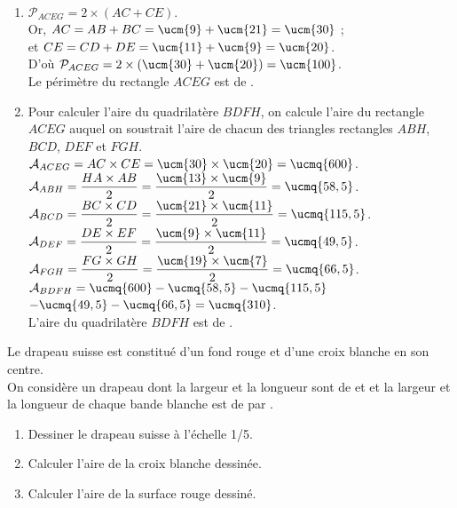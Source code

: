 \begin{colonne*exercice}
\begin{corrige}
   \ \\ [-5mm]
   \begin{enumerate}
      \item $\mathcal{P}_{ACEG} =2\times(AC+CE)$. \\
         Or, $AC =AB+BC =\ucm{9}+\ucm{21} =\ucm{30}$ ;\\
         et $CE =CD+DE =\ucm{11}+\ucm{9} =\ucm{20}$. \\
         D'où $\mathcal{P}_{ACEG} =2\times(\ucm{30}+\ucm{20}) =\ucm{100}$. \\
         {\blue Le périmètre du rectangle $ACEG$ est de }.
      \item Pour calculer l'aire du quadrilatère $BDFH$, on calcule l'aire du rectangle $ACEG$ auquel on soustrait l'aire de chacun des triangles rectangles $ABH$, $BCD$, $DEF$ et $FGH$. \\
      $\mathcal{A}_{ACEG} =AC\times CE =\ucm{30}\times\ucm{20} =\ucmq{600}$. \\ [1.5mm]
      $\mathcal{A}_{ABH} =\dfrac{HA\times AB}{2} =\dfrac{\ucm{13}\times\ucm{9}}{2} =\ucmq{58,5}$. \\ [1.5mm]
      $\mathcal{A}_{BCD} =\dfrac{BC\times CD}{2} =\dfrac{\ucm{21}\times\ucm{11}}{2} =\ucmq{115,5}$. \\ [1.5mm]
      $\mathcal{A}_{DEF} =\dfrac{DE\times EF}{2} =\dfrac{\ucm{9}\times\ucm{11}}{2} =\ucmq{49,5}$. \\ [1mm]
      $\mathcal{A}_{FGH} = \dfrac{FG\times GH}{2} =\dfrac{\ucm{19}\times\ucm{7}}{2} =\ucmq{66,5}$. \\ [1.5mm]
      $\mathcal{A}_{BDFH} =\ucmq{600}-\ucmq{58,5}-\ucmq{115,5}$ \\
      \hspace*{14mm} $-\ucmq{49,5}-\ucmq{66,5} =\ucmq{310}$. \\
      {\blue L'aire du quadrilatère $BDFH$ est de }.
   \end{enumerate}
\end{corrige}

\smallskip

\begin{exercice} %
   Le drapeau suisse est constitué d'un fond rouge et d'une croix blanche en son centre. \\
   On considère un drapeau dont la largeur et la longueur sont de  et  et la largeur et la longueur de chaque bande blanche est de  par .
   \begin{enumerate}
      \item Dessiner le drapeau suisse à l'échelle 1/5.
      \item Calculer l'aire de la croix blanche dessinée.
      \item Calculer l'aire de la surface rouge dessiné.
   \end{enumerate}
\end{exercice}


\end{colonne*exercice}
